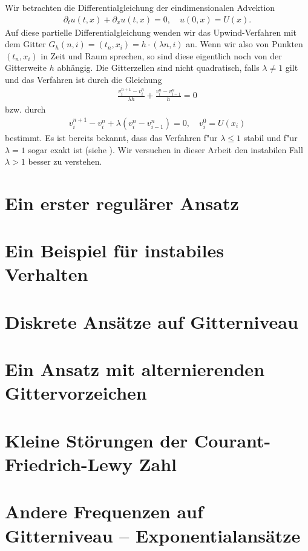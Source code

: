 
Wir betrachten die Differentialgleichung der eindimensionalen Advektion
\begin{align}\label{eq:adv:pde}
\partial_t u(t, x) + \partial_x u(t, x) = 0, \quad u(0, x) = U(x).
\end{align}
Auf diese partielle Differentialgleichung wenden wir das Upwind-Verfahren mit dem Gitter $G_h(n,i) = (t_n, x_i) = h \cdot (\lambda n, i)$ an.
Wenn wir also von Punkten $(t_n, x_i)$ in Zeit und Raum sprechen, so sind diese eigentlich noch von der Gitterweite $h$ abhängig. 
Die Gitterzellen sind nicht quadratisch, falls $\lambda \neq 1$ gilt und das Verfahren ist durch die Gleichung
\begin{align}\label{eq:adv:scheme_rechnung}
\frac {v^{n+1}_i - v^n_i} {\lambda h} + \frac {v^n_i - v^n_{i-1}} h = 0
\end{align}
bzw. durch
\begin{align}\label{eq:adv:scheme}
v^{n+1}_i - v^n_i + \lambda (v^n_i - v^n_{i-1}) = 0, \quad v^0_i = U(x_i)
\end{align}
bestimmt.
Es ist bereits bekannt, dass das Verfahren f"ur $\lambda \leq 1$ stabil und f"ur $\lambda = 1$ sogar exakt ist (siehe \cite{leveque2002finite}).
Wir versuchen in dieser Arbeit den instabilen Fall $\lambda > 1$ besser zu verstehen.

\section{Ein erster regulärer Ansatz}\label{sec:regulaer}



\section{Ein Beispiel für instabiles Verhalten}\label{sec:transport:beispiel}



\section {Diskrete Ansätze auf Gitterniveau} \label{sec:transport:diskret}



\section {Ein Ansatz mit alternierenden Gittervorzeichen}\label{sec:transport:osz}



\section{Kleine Störungen der Courant-Friedrich-Lewy Zahl}\label{sec:transport:kleineta}



\section{Andere Frequenzen auf Gitterniveau -- Exponentialansätze}

